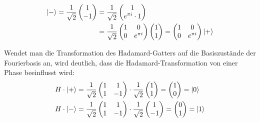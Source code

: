 \begin{align*}
  \ket{-} =
  \frac{1}{\sqrt{2}}
  \begin{pmatrix}
    1 \\
   - 1
  \end{pmatrix} &= 
  \frac{1}{\sqrt{2}}
  \begin{pmatrix}
    1 \\
   e^{\pi i} \cdot 1
  \end{pmatrix} \\ &= 
  \frac{1}{\sqrt{2}}
  \begin{pmatrix}
    1 & 0 \\
    0 & e^{\pi i}
  \end{pmatrix}
  \begin{pmatrix}
    1 \\
    1
  \end{pmatrix} = 
  \begin{pmatrix}
    1 & 0 \\
    0 & e^{\pi i}
  \end{pmatrix}
  \ket{+}
  \end{align*}

Wendet man die Transformation des Hadamard-Gatters auf die Basiszustände der Fourierbasis an, 
wird deutlich,
dass die Hadamard-Transformation von einer Phase beeinflusst wird:
\begin{align*}
  H \cdot \ket{+} &=
  \frac{1}{\sqrt{2}}
  \begin{pmatrix}
    1 & 1 \\
    1 & -1
  \end{pmatrix}
  \cdot
  \frac{1}{\sqrt{2}}
  \begin{pmatrix}
    1 \\
    1
  \end{pmatrix}
  =
  \begin{pmatrix}
    1 \\
    0
  \end{pmatrix}
  =
  \ket{0}\\
  H \cdot \ket{-} &=
  \frac{1}{\sqrt{2}}
  \begin{pmatrix}
    1 & 1 \\
    1 & -1
  \end{pmatrix}
  \cdot
  \frac{1}{\sqrt{2}}
  \begin{pmatrix}
    1 \\
    -1
  \end{pmatrix}
  =
  \begin{pmatrix}
    0 \\
    1
  \end{pmatrix}
  =
  \ket{1}
\end{align*}


